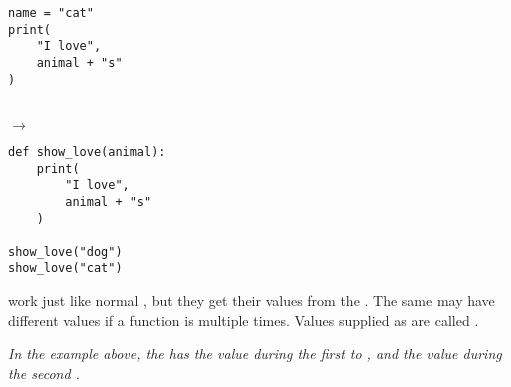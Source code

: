 \documentclass{handout}
\begin{document}
\begin{multicols*}{2}
\begin{minipage}[t]{0.42\columnwidth}
\begin{lstlisting}
name = "cat"
print(
    "I love",
    animal + "s"
)
\end{lstlisting}
\end{minipage}
\begin{minipage}[t]{0.05\columnwidth}
\  \\
\hspace*{1ex}$\rightarrow$
\end{minipage}
\begin{minipage}[t]{0.42\columnwidth}
\begin{lstlisting}
def show_love(animal):
    print(
        "I love",
        animal + "s"
    )

show_love("dog")
show_love("cat")
\end{lstlisting}
\end{minipage}

\noindent
{} work just like normal , but they get their values from the . The same  may have different values if a function is  multiple times. Values supplied as  are called .

\textsl{In the example above, the   has the value
 during the first  to , and the
value  during the second .}


\end{multicols*}
\end{document}
